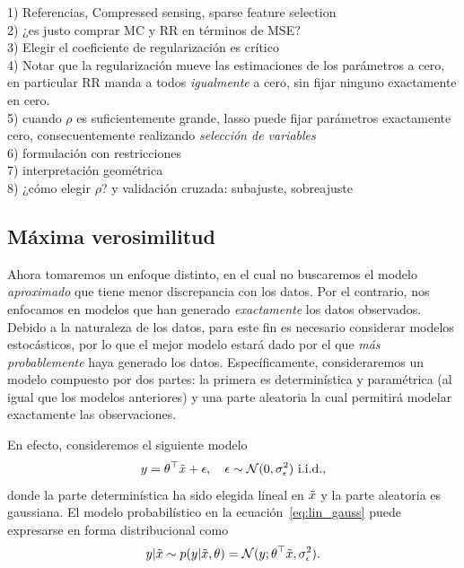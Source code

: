 \begin{mdframed}[style=pendiente, frametitle={\center Regularización versus mínimos cuadrados}]
1) Referencias, Compressed sensing, sparse feature selection\\
2) ¿es justo comprar MC y RR en términos de MSE?\\
3) Elegir el coeficiente de regularización es crítico\\
4) Notar que la regularización mueve las estimaciones de los parámetros a cero, en particular RR manda a todos \emph{igualmente} a cero, sin fijar ninguno exactamente en cero. \\
5) cuando $\rho$ es suficientemente grande, lasso puede fijar parámetros exactamente cero, consecuentemente realizando \emph{selección de variables}\\
6) formulación con restricciones\\
7) interpretación geométrica\\
8) ¿cómo elegir $\rho$? y validación cruzada: subajuste, sobreajuste
\end{mdframed}

\subsection{Máxima verosimilitud} %
\label{ssub:max_ver}

Ahora tomaremos un enfoque distinto, en el cual no buscaremos el modelo \emph{aproximado} que tiene menor discrepancia con los datos. Por el contrario, nos enfocamos en modelos que han generado \emph{exactamente} los datos observados. Debido a la naturaleza de los datos, para este fin es necesario considerar modelos estocásticos, por lo que el mejor modelo estará dado por el que \emph{más probablemente} haya generado los datos. Específicamente, consideraremos un modelo compuesto por dos partes: la primera es determinística y paramétrica (al igual que los modelos anteriores) y una parte aleatoria la cual permitirá modelar exactamente las observaciones. 

En efecto, consideremos el siguiente modelo
\begin{equation}
	y = \theta^\top\tilde{x} + \epsilon,\quad \epsilon\sim{\mathcal N}(0,\sigma_\epsilon^2) \ \text{i.i.d.},
	\label{eq:lin_gauss}
\end{equation}
donde la parte determinística ha sido elegida lineal en $\tilde{x}$ y la parte aleatoria es gaussiana. El modelo probabilístico en la ecuación~\eqref{eq:lin_gauss} puede expresarse en forma distribucional como 
\begin{equation}
	y|\tilde{x} \sim p(y|\tilde{x},\theta) = {\mathcal N}(y;\theta^\top\tilde{x},\sigma_\epsilon^2).
\end{equation}

